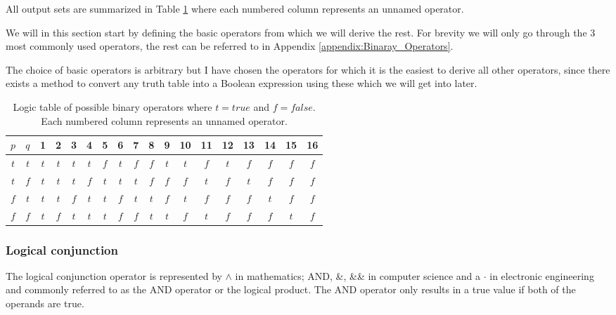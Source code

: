             All output sets are summarized in Table \ref{LogicTable:PossibleOperators} where each numbered column represents an unnamed operator. 
            
            We will in this section start by defining the basic operators from which we will derive the rest. For brevity we will only go through the 3 most commonly used operators, the rest can be referred to in Appendix \ref{appendix:Binaray_Operators}.  
            
            The choice of basic operators is arbitrary but I have chosen the operators for which it is the easiest to derive all other operators, since there exists a method to convert any truth table into a Boolean expression using these which we will get into later.
             
            
            \begin{table}[h!]
                \centering
                \begin{tabular}{|c|c||c|c|c|c|c|c|c|c|c|c|c|c|c|c|c|c|}
                	\hline
                	$p$ & $q$ &  1  &  2  &  3  &  4  &  5  &  6  &  7  &  8  &  9  & 10  & 11  & 12  & 13  & 14  & 15  & 16  \\ \hline
                	$t$ & $t$ & $t$ & $t$ & $t$ & $t$ & $f$ & $t$ & $f$ & $f$ & $t$ & $t$ & $f$ & $t$ & $f$ & $f$ & $f$ & $f$ \\ \hline
                	$t$ & $f$ & $t$ & $t$ & $t$ & $f$ & $t$ & $t$ & $t$ & $f$ & $f$ & $f$ & $t$ & $f$ & $t$ & $f$ & $f$ & $f$ \\ \hline
                	$f$ & $t$ & $t$ & $t$ & $f$ & $t$ & $t$ & $f$ & $t$ & $t$ & $f$ & $t$ & $f$ & $f$ & $f$ & $t$ & $f$ & $f$ \\ \hline
                	$f$ & $f$ & $t$ & $f$ & $t$ & $t$ & $t$ & $f$ & $f$ & $t$ & $t$ & $f$ & $t$ & $f$ & $f$ & $f$ & $t$ & $f$ \\ \hline
                \end{tabular} 
                \caption{Logic table of possible binary operators where $t=true$ and $f=false$. Each numbered column represents an unnamed operator.}
                \label{LogicTable:PossibleOperators}
            \end{table}
        
            \subsubsection{Logical conjunction}
        
                The logical conjunction operator is represented by $\wedge$ in mathematics; AND, \&, \&\& in computer science and a $\cdot$ in electronic engineering and commonly referred to as the AND operator or the logical product. The AND operator only results in a true value if both of the operands are true.
                
